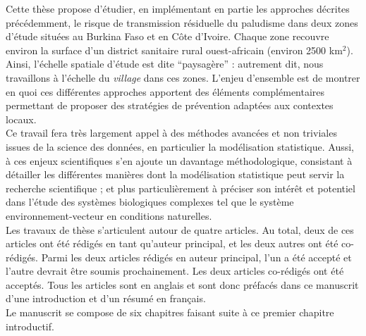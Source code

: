 \documentclass[12pt,twoside]{reedthesis}
\begin{document}
Cette thèse propose d'étudier, en implémentant en partie les approches décrites précédemment, le risque de transmission résiduelle du paludisme dans deux zones d'étude situées au Burkina Faso et en Côte d'Ivoire. Chaque zone recouvre environ la surface d'un district sanitaire rural ouest-africain (environ 2500 km\(^2\)). Ainsi, l'échelle spatiale d'étude est dite ``paysagère'' : autrement dit, nous travaillons à l'échelle du \emph{village} dans ces zones. L'enjeu d'ensemble est de montrer en quoi ces différentes approches apportent des éléments complémentaires permettant de proposer des stratégies de prévention adaptées aux contextes locaux.\\

Ce travail fera très largement appel à des méthodes avancées et non triviales issues de la science des données, en particulier la modélisation statistique. Aussi, à ces enjeux scientifiques s'en ajoute un davantage méthodologique, consistant à détailler les différentes manières dont la modélisation statistique peut servir la recherche scientifique ; et plus particulièrement à préciser son intérêt et potentiel dans l'étude des systèmes biologiques complexes tel que le système environnement-vecteur en conditions naturelles.\\

Les travaux de thèse s'articulent autour de quatre articles. Au total, deux de ces articles ont été rédigés en tant qu'auteur principal, et les deux autres ont été co-rédigés. Parmi les deux articles rédigés en auteur principal, l'un a été accepté et l'autre devrait être soumis prochainement. Les deux articles co-rédigés ont été acceptés. Tous les articles sont en anglais et sont donc préfacés dans ce manuscrit d'une introduction et d'un résumé en français.\\

Le manuscrit se compose de six chapitres faisant suite à ce premier chapitre introductif.\\
\end{document}

